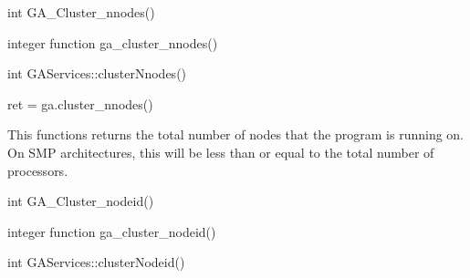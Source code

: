 \documentclass[12pt]{article}
\begin{document}

\begin{capi}
\begin{ccode}
int GA_Cluster_nnodes()
\end{ccode}
\end{capi}

\begin{fapi}
\begin{fcode}
integer function ga_cluster_nnodes()
\end{fcode}
\end{fapi}

\begin{cxxapi}
\begin{cxxcode}
int GAServices::clusterNnodes()
\end{cxxcode}
\end{cxxapi}

\begin{pyapi}
\begin{pycode}
ret = ga.cluster_nnodes()
\end{pycode}
\end{pyapi}

\local

\begin{desc}

This functions returns the total number of nodes that the program is running
on. On SMP architectures, this will be less than or equal to the total number
of processors.

\end{desc}


\begin{capi}
\begin{ccode}
int GA_Cluster_nodeid()
\end{ccode}
\end{capi}

\begin{fapi}
\begin{fcode}
integer function ga_cluster_nodeid()
\end{fcode}
\end{fapi}

\begin{cxxapi}
\begin{cxxcode}
int GAServices::clusterNodeid()
\end{cxxcode}
\end{cxxapi}
\end{document}
